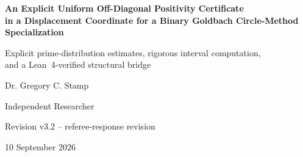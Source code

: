 \documentclass[11pt]{article}
\theoremstyle{definition}
\begin{document}
\begin{titlepage}
\centering
\vspace*{0.5in}
{\Large\bfseries\color{navy} An Explicit Uniform Off-Diagonal Positivity Certificate\\[0.15in]
 in a Displacement Coordinate for a Binary Goldbach Circle-Method Specialization\par}
\vspace{0.28in}
{\large Explicit prime-distribution estimates, rigorous interval computation,\\ and a Lean~4-verified structural bridge\par}
\vspace{0.45in}
{\Large Dr. Gregory C. Stamp\par}
\vspace{0.10in}
{\normalsize Independent Researcher\par}
\vspace{0.18in}
{\normalsize Revision v3.2 -- referee-response revision\par}
{\normalsize 10 September 2026\par}
\vfill
\end{titlepage}

\begin{abstract}
We establish an explicit positivity theorem for a fixed off-diagonal component arising from an exact displacement-coordinate reorganization of a Binary Goldbach circle-method specialization. Ordered prime pairs are grouped by their integer displacement from the target, preserving arithmetic and Fourier sign information that can be lost under premature absolute-value estimates. For the specialization studied here, the resulting off-diagonal contribution separates into three residue-class imbalances, and each is proved strictly positive for every even integer at least 56.

The proof combines exact analytic identities, explicit prime-distribution estimates of Ramar\'{e}--Rumely, rigorous Python-FLINT/Arb interval certification for the finite range, and Lean~4 verification of the structural bridge from signed-imbalance positivity to the intended core-domination inequality. A central fidelity result proves that the finite Stage-A lower certificate bounds the exact theorem object rather than a surrogate, and the treatment of prime jumps in the finite integral bound is matched directly to the generator code. The result closes this off-diagonal sign problem as a stable, reproducible module in a broader Binary Goldbach program. It does not prove the Binary Goldbach conjecture; an independent quantitative lower bound for the complementary major-side contribution remains the next mathematical gate.
\end{abstract}
\end{document}
